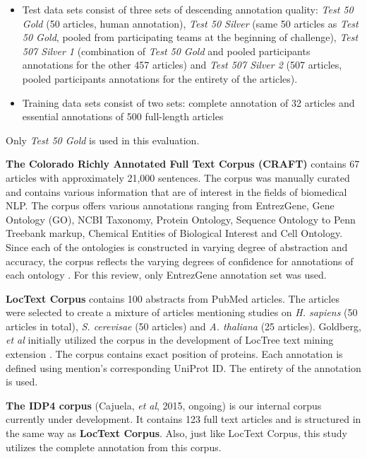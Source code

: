 \begin{itemize}
\item Test data sets consist of three sets of descending annotation quality: \textit{Test 50 Gold} (50 articles, human annotation), \textit{Test 50 Silver} (same 50 articles as \textit{Test 50 Gold}, pooled from participating teams at the beginning of challenge), \textit{Test 507 Silver 1} (combination of \textit{Test 50 Gold} and pooled participants annotations for the other 457 articles) and \textit{Test 507 Silver 2} (507 articles, pooled participants annotations for the entirety of the articles).

\item Training data sets consist of two sets: complete annotation of 32 articles and essential annotations of 500 full-length articles
\end{itemize} 

Only \textit{Test 50 Gold} is used in this evaluation.

\textbf{The Colorado Richly Annotated Full Text Corpus (CRAFT)} \citep{verspoor2012corpus} \citep{bada2012concept} contains 67 articles with approximately 21,000 sentences. The corpus was manually curated and contains various information that are of interest in the fields of biomedical NLP. The corpus offers various annotations ranging from EntrezGene, Gene Ontology (GO), NCBI Taxonomy, Protein Ontology, Sequence Ontology to Penn Treebank markup, Chemical Entities of Biological Interest and Cell Ontology. Since each of the ontologies is constructed in varying degree of abstraction and accuracy, the corpus reflects the varying degrees of confidence for annotations of each ontology \citep{bada2012concept}. For this review, only EntrezGene annotation set was used.

\textbf{LocText Corpus} \citep{goldberg2015linked} contains 100 abstracts from PubMed articles. The articles were selected to create a mixture of articles mentioning studies on \textit{H. sapiens} (50 articles in total), \textit{S. cerevisae} (50 articles) and \textit{A. thaliana} (25 articles). Goldberg, \textit{et al} initially utilized the corpus in the development of LocTree text mining extension \citep{goldberg2012loctree2}. The corpus contains exact position of proteins. Each annotation is defined using mention's corresponding UniProt ID. The entirety of the annotation is used.

\textbf{The IDP4 corpus} (Cajuela, \textit{et al}, 2015, ongoing) is our internal corpus currently under development. It contains 123 full text articles and is structured in the same way as \textbf{LocText Corpus}. Also, just like LocText Corpus, this study utilizes the complete annotation from this corpus.

